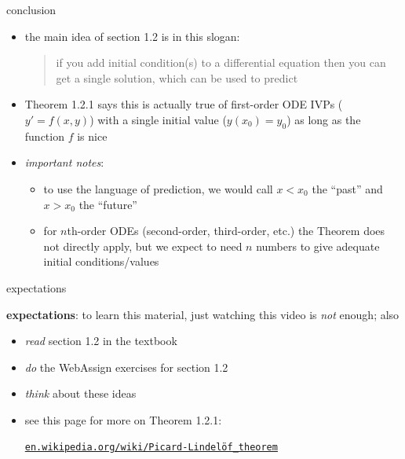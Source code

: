 \documentclass{beamer}
\begin{document}
\begin{frame}{conclusion}

\begin{itemize}
\item the main idea of section 1.2 is in this slogan:

\bigskip

\begin{quote}
\alert{if you add initial condition(s) to a differential equation then you can get a single solution}, which can be used to predict
\end{quote}

\bigskip

\item Theorem 1.2.1 says this is actually true of first-order ODE IVPs ($y'=f(x,y)$) with a single initial value ($y(x_0)=y_0$) as long as the function $f$ is nice
\item \emph{important notes}:
    \begin{itemize}
    \item to use the language of prediction, we would call $x<x_0$ the ``past'' and $x>x_0$ the ``future''
    \item for $n$th-order ODEs (second-order, third-order, etc.) the Theorem does not directly apply, but we expect to need $n$ numbers to give adequate initial conditions/values
    \end{itemize}
\end{itemize}
\end{frame}


\begin{frame}{expectations}

\textbf{expectations}:  to learn this material, just watching this video is \emph{not} enough; also
\begin{itemize}
\item \emph{read} section 1.2 in the textbook
\item \emph{do} the WebAssign exercises for section 1.2
\item \emph{think} about these ideas

\bigskip
\item see this page for more on Theorem 1.2.1:

\centerline{\href{https://en.wikipedia.org/wiki/Picard-Lindelof_theorem}{\texttt{en.wikipedia.org/wiki/Picard-Lindel\"of\_theorem}}}
\end{itemize}
\end{frame}
\end{document}
